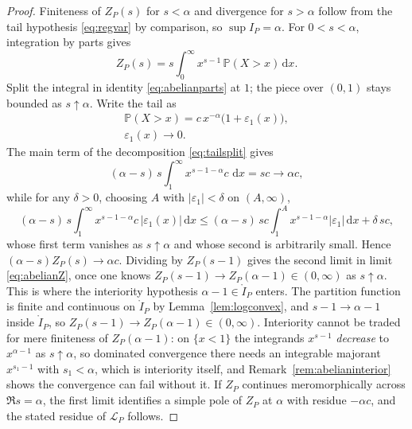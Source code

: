 \documentclass[sn-mathphys-num]{sn-jnl}
\theoremstyle{thmstyleone}%
\theoremstyle{thmstyletwo}%
\theoremstyle{thmstylethree}%
\theoremstyle{thmstyleone}%
\providecommand{\Prob}{\mathbb{P}}
\providecommand{\Leh}{\mathscr{L}}
\providecommand{\dd}{\,\mathrm{d}}
\begin{document}
\begin{appendices}
		\propabelian*
		
		\begin{proof}
			Finiteness of $Z_P(s)$ for $s<\alpha$ and divergence for
			$s>\alpha$ follow from the tail hypothesis \eqref{eq:regvar} by
			comparison, so $\sup I_P=\alpha$. For $0<s<\alpha$, integration
			by parts gives
			\begin{equation}\label{eq:abelianparts}
				Z_P(s)=s\int_0^\infty x^{s-1}\,\Prob(X>x)\dd x .
			\end{equation}
			Split the integral in identity \eqref{eq:abelianparts} at $1$; the piece
			over $(0,1)$ stays bounded as $s\uparrow\alpha$. Write the tail
			as
			\begin{equation}\label{eq:tailsplit}
				\begin{gathered}
					\Prob(X>x)=c\,x^{-\alpha}\bigl(1+\varepsilon_1(x)\bigr),\\
					\varepsilon_1(x)\longrightarrow0 .
				\end{gathered}
			\end{equation}
			The main term of the decomposition \eqref{eq:tailsplit} gives
			\begin{equation}\label{eq:abelianmain}
				(\alpha-s)\,s\int_1^\infty x^{s-1-\alpha}c\,\dd x
				=sc\longrightarrow\alpha c ,
			\end{equation}
			while for any $\delta>0$, choosing $A$ with
			$|\varepsilon_1|<\delta$ on $(A,\infty)$,
			\begin{equation}\label{eq:abelianerr}
				(\alpha-s)\,s\int_1^\infty x^{s-1-\alpha}c\,|\varepsilon_1(x)|
				\dd x
				\le (\alpha-s)\,sc\!\int_1^A x^{s-1-\alpha}|\varepsilon_1|\dd x
				+\delta\,sc ,
			\end{equation}
			whose first term vanishes as $s\uparrow\alpha$ and whose second
			is arbitrarily small. Hence $(\alpha-s)Z_P(s)\to\alpha c$.
			Dividing by $Z_P(s-1)$ gives the second limit in limit
			\eqref{eq:abelianZ}, once one knows
			$Z_P(s-1)\to Z_P(\alpha-1)\in(0,\infty)$ as $s\uparrow\alpha$.
			This is where the interiority hypothesis
			$\alpha-1\in\mathring I_P$ enters. The partition function is
			finite and continuous on $\mathring I_P$ by
			Lemma~\ref{lem:logconvex}, and $s-1\to\alpha-1$ inside
			$\mathring I_P$, so
			$Z_P(s-1)\to Z_P(\alpha-1)\in(0,\infty)$. Interiority
			cannot be traded for mere finiteness of $Z_P(\alpha-1)$: on
			$\{x<1\}$ the integrands $x^{s-1}$ \emph{decrease} to
			$x^{\alpha-1}$ as $s\uparrow\alpha$, so dominated
			convergence there needs an integrable majorant $x^{s_1-1}$
			with $s_1<\alpha$, which is interiority itself, and
			Remark~\ref{rem:abelianinterior} shows the convergence can
			fail without it. If $Z_P$ continues
			meromorphically across $\Re s=\alpha$, the first limit
			identifies a simple pole of $Z_P$ at $\alpha$ with residue
			$-\alpha c$, and the stated residue of $\Leh_P$ follows.
		\end{proof}
		

\end{appendices}
\end{document}
